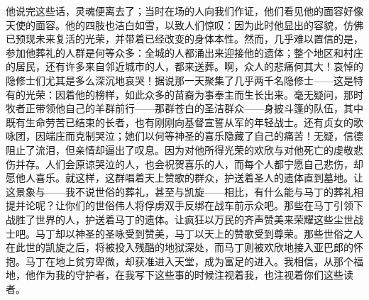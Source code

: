 他说完这些话，灵魂便离去了；当时在场的人向我们作证，他们看见他的面容好像天使的面容。他的四肢也洁白如雪，以致人们惊叹：因为此时他显出的容貌，仿佛已预现未来复活的光荣，并带着已经改变的身体本性。然而，几乎难以置信的是，参加他葬礼的人群是何等众多：全城的人都涌出来迎接他的遗体；整个地区和村庄的居民，还有许多来自邻近城市的人，都来送葬。啊，众人的悲痛何其大！哀悼的隐修士们尤其是多么深沉地哀哭！据说那一天聚集了几乎两千名隐修士——这是特有的光荣：因着他的榜样，如此众多的苗裔为事奉主而生长出来。毫无疑问，那时牧者正带领他自己的羊群前行——那群苍白的圣洁群众——身披斗篷的队伍，其中既有生命劳苦已结束的长者，也有刚刚向基督宣誓从军的年轻战士。还有贞女的歌咏团，因端庄而克制哭泣；她们以何等神圣的喜乐隐藏了自己的痛苦！无疑，信德阻止了流泪，但亲情却逼出了叹息。因为对他所得光荣的欢欣与对他死亡的虔敬悲伤并存。人们会原谅哭泣的人，也会祝贺喜乐的人，而每个人都宁愿自己悲伤，却愿他人喜乐。就这样，这群唱着天上赞歌的群众，护送着圣人的遗体直到墓地。让这景象与——我不说世俗的葬礼，甚至与凯旋——相比，有什么能与马丁的葬礼相提并论呢？让你们的世俗伟人将俘虏双手反绑在战车前示众吧。那些在马丁引领下战胜了世界的人，护送着马丁的遗体。让疯狂以万民的齐声赞美来荣耀这些尘世战士吧。马丁却以神圣的圣咏受到赞美，马丁以天上的赞歌受到尊荣。那些世俗之人在此世的凯旋之后，将被投入残酷的地狱深处，而马丁则被欢欣地接入亚巴郎的怀抱。马丁在地上贫穷卑微，却获准进入天堂，成为富足的进入。我相信，从那个福地，他作为我的守护者，在我写下这些事的时候注视着我，也注视着你们这些读者。\par

